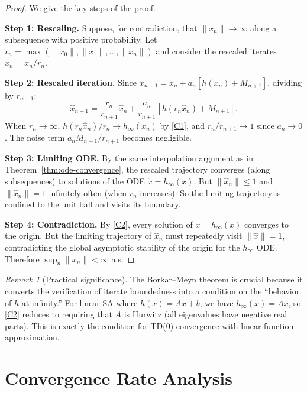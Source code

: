 \documentclass[11pt,a4paper]{article}
\theoremstyle{definition}
\theoremstyle{plain}
\theoremstyle{remark}
\newtheorem{remark}{Remark}[section]
\begin{document}
\begin{proof}
We give the key steps of the proof.

\medskip
\noindent\textbf{Step 1: Rescaling.}
Suppose, for contradiction, that $\|x_n\| \to \infty$ along a subsequence with
positive probability. Let $r_n = \max(\|x_0\|, \|x_1\|, \ldots, \|x_n\|)$ and
consider the rescaled iterates $\hat{x}_n = x_n / r_n$.

\medskip
\noindent\textbf{Step 2: Rescaled iteration.}
Since $x_{n+1} = x_n + a_n[h(x_n) + M_{n+1}]$, dividing by $r_{n+1}$:
\[
  \hat{x}_{n+1} = \frac{r_n}{r_{n+1}} \hat{x}_n
    + \frac{a_n}{r_{n+1}} [h(r_n \hat{x}_n) + M_{n+1}].
\]
When $r_n \to \infty$, $h(r_n \hat{x}_n) / r_n \to h_\infty(\hat{x}_n)$ by \ref{C1},
and $r_n / r_{n+1} \to 1$ since $a_n \to 0$. The noise term $a_n M_{n+1}/r_{n+1}$
becomes negligible.

\medskip
\noindent\textbf{Step 3: Limiting ODE.}
By the same interpolation argument as in Theorem~\ref{thm:ode-convergence}, the
rescaled trajectory converges (along subsequences) to solutions of the ODE
$\dot{x} = h_\infty(x)$. But $\|\hat{x}_n\| \leq 1$ and $\|\hat{x}_n\| = 1$
infinitely often (when $r_n$ increases). So the limiting trajectory is confined to
the unit ball and visits its boundary.

\medskip
\noindent\textbf{Step 4: Contradiction.}
By \ref{C2}, every solution of $\dot{x} = h_\infty(x)$ converges to the origin.
But the limiting trajectory of $\hat{x}_n$ must repeatedly visit $\|\hat{x}\| = 1$,
contradicting the global asymptotic stability of the origin for the $h_\infty$ ODE.
Therefore $\sup_n \|x_n\| < \infty$ a.s.
\end{proof}

\begin{remark}[Practical significance]
\label{rem:borkar-meyn-practical}
The Borkar--Meyn theorem is crucial because it converts the verification of iterate
boundedness into a condition on the ``behavior of $h$ at infinity.'' For linear SA
where $h(x) = Ax + b$, we have $h_\infty(x) = Ax$, so \ref{C2} reduces to
requiring that $A$ is Hurwitz (all eigenvalues have negative real parts). This is
exactly the condition for TD(0) convergence with linear function approximation.
\end{remark}


\section{Convergence Rate Analysis}
\label{sec:convergence-rate}
\end{document}
